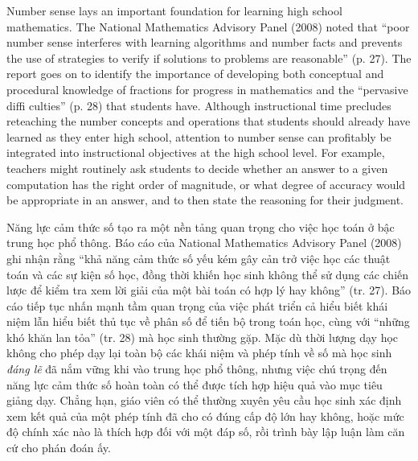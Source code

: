 \documentclass[
  10pt,
  a4paper,
  landscape,
  twoside,
  openany
]{scrbook}
\newcommand{\EN}[1]{#1}
\newcommand{\VI}[1]{#1}
\newcommand{\NOTE}[1]{#1}
\newcounter{example}
\begin{document}
\TriPara
{
\EN{Number sense lays an important foundation for learning high school mathematics. The National Mathematics Advisory Panel (2008) noted that ``poor number sense interferes with learning algorithms and number facts and prevents the use of strategies to verify if solutions to problems are reasonable'' (p. 27). The report goes on to identify the importance of developing both conceptual and procedural knowledge of fractions for progress in mathematics and the ``pervasive diffi culties'' (p. 28) that students have. Although instructional time precludes reteaching the number concepts and operations that students should already have learned as they enter high school, attention to number sense can profitably be integrated into instructional objectives at the high school level. For example, teachers might routinely ask students to decide whether an answer to a given computation has the right order of magnitude, or what degree of accuracy would be appropriate in an answer, and to then state the reasoning for their judgment.}
}
{
\VI{
Năng lực cảm thức số tạo ra một nền tảng quan trọng cho việc học toán ở bậc trung học phổ thông. Báo cáo của National Mathematics Advisory Panel (2008) ghi nhận rằng ``khả năng cảm thức số yếu kém gây cản trở việc học các thuật toán và các sự kiện số học, đồng thời khiến học sinh không thể sử dụng các chiến lược để kiểm tra xem lời giải của một bài toán có hợp lý hay không'' (tr. 27). Báo cáo tiếp tục nhấn mạnh tầm quan trọng của việc phát triển cả hiểu biết khái niệm lẫn hiểu biết thủ tục về phân số để tiến bộ trong toán học, cùng với ``những khó khăn lan tỏa'' (tr. 28) mà học sinh thường gặp. Mặc dù thời lượng dạy học không cho phép dạy lại toàn bộ các khái niệm và phép tính về số mà học sinh \emph{đáng lẽ} đã nắm vững khi vào trung học phổ thông, nhưng việc chú trọng đến năng lực cảm thức số hoàn toàn có thể được tích hợp hiệu quả vào mục tiêu giảng dạy. Chẳng hạn, giáo viên có thể thường xuyên yêu cầu học sinh xác định xem kết quả của một phép tính đã cho có đúng cấp độ lớn hay không, hoặc mức độ chính xác nào là thích hợp đối với một đáp số, rồi trình bày lập luận làm căn cứ cho phán đoán ấy.}
}
{
\NOTE{}
}
\end{document}
